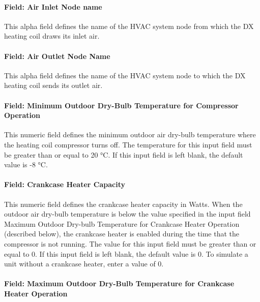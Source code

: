 \paragraph{Field: Air Inlet Node name}\label{field-air-inlet-node-name-14}

This alpha field defines the name of the HVAC system node from which the DX heating coil draws its inlet air.

\paragraph{Field: Air Outlet Node Name}\label{field-air-outlet-node-name-14}

This alpha field defines the name of the HVAC system node to which the DX heating coil sends its outlet air.

\paragraph{Field: Minimum Outdoor Dry-Bulb Temperature for Compressor Operation}\label{field-minimum-outdoor-dry-bulb-temperature-for-compressor-operation-1}

This numeric field defines the minimum outdoor air dry-bulb temperature where the heating coil compressor turns off. The temperature for this input field must be greater than or equal to 20 °C. If this input field is left blank, the default value is -8 °C.

\paragraph{Field: Crankcase Heater Capacity}\label{field-crankcase-heater-capacity-5}

This numeric field defines the crankcase heater capacity in Watts. When the outdoor air dry-bulb temperature is below the value specified in the input field Maximum Outdoor Dry-bulb Temperature for Crankcase Heater Operation (described below), the crankcase heater is enabled during the time that the compressor is not running. The value for this input field must be greater than or equal to 0. If this input field is left blank, the default value is 0. To simulate a unit without a crankcase heater, enter a value of 0.

\paragraph{Field: Maximum Outdoor Dry-Bulb Temperature for Crankcase Heater Operation}\label{field-maximum-outdoor-dry-bulb-temperature-for-crankcase-heater-operation-5}

